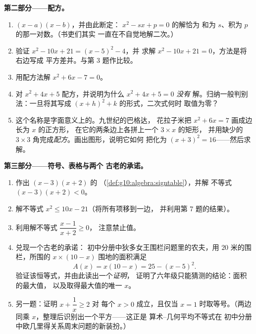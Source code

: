 \begin{problem}[{周末问题——和积问题，
以花拉子米的作图方式配方，以及
方程 $x^2 = x + 1$}]
\medskip
\noindent\textbf{第二部分——配方。}
\begin{enumerate}[resume]
  \item {} $(x - a)(x - b)$，并由此断定：
        $x^2 - sx + p = 0$ 的解恰为
        和为 $s$、积为 $p$ 的那一对数。（书吏们其实
        一直在不自觉地解二次。）
  \item 验证 $x^2 - 10x + 21 = (x - 5)^2 - 4$，并
        求解 $x^2 - 10x + 21 = 0$，方法是将右边写成
        平方差并。与第 3 题作比较。
  \item 用配方法解 $x^2 + 6x - 7 = 0$。
  \item 对 $x^2 + 4x + 5$ 配方，并说明为什么
         $x^2 + 4x + 5 = 0$ \emph{没有}
        解。归纳一般判别法：一旦将其写成
        $(x + h)^2 + k$ 的形式，二次式何时
        取值为零？
  \item 这个名称是字面意义上的。九世纪的巴格达，
        花拉子米把 $x^2 + 6x = 7$ 画成边长为 $x$ 的正方形，
        在它的两条边上各拼上一个 $3 \times x$ 的矩形，
        并用缺少的
        $3 \times 3$ 角完成\emph{配方}。画出图形，说明它如何
        把化为 $(x + 3)^2 = 16$——然后求解。
\end{enumerate}

\medskip
\noindent\textbf{第三部分——符号、表格与两个
古老的承诺。}
\begin{enumerate}[resume]
  \item 作出 $(x - 3)(x + 2)$ 的
        （\cref{def:g10:algebra:signtable}），并解
        不等式 $(x - 3)(x + 2) < 0$。
  \item 解不等式 $x^2 \leq 10x - 21$（将所有项移到一边，
        并利用第 7 题的结果）。
  \item 利用解不等式 $\dfrac{x - 1}{x + 2} \geq 0$，
        注意禁止值。
  \item 兑现一个古老的承诺：
        初中分册中狄多女王围栏问题里的农夫，用 $20$ 米的围栏，所围的
        $x \times (10 - x)$ 围地的面积满足
        \[
        A(x) = x(10 - x) = 25 - (x - 5)^2 .
        \]
        验证该恒等式，并由此读出一个\emph{证明}，
        证明了六年级只能猜测的结论：面积的最大值，
        以及取得最大值的唯一 $x$。
  \item 另一题：证明 $x + \dfrac1x \geq 2$ 对
        每个 $x > 0$ 成立，且仅当 $x = 1$ 时取等号。（两边同乘
        $x$，整理后识别出一个平方——这正是
        算术--几何平均不等式在
        初中分册中欧几里得关系周末问题的新装扮。）
\end{enumerate}


\end{problem}
